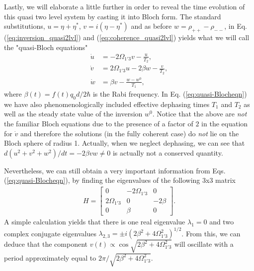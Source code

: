 \documentclass[]{spie}  %
\begin{document}
Lastly, we will elaborate a little further in order to reveal the time evolution of this quasi two level system by casting it into Bloch form. The standard substitutions, $u=\eta + \eta^*$, $v = i(\eta - \eta^*)$ and as before $w = \rho_{++}-\rho_{--}$, in Eq. (\ref{eq:inversion_quasi2lvl}) and (\ref{eq:coherence_quasi2lvl}) yields what we will call the "quasi-Bloch equations"
\begin{subequations}
\label{eq:quasi-Blocheqn}
\begin{align}
\dot{u} &= -2\Omega_{1'3} v - \frac{u}{T_2}, \\
\dot{v} &= 2\Omega_{1'3} u -2\beta w - \frac{v}{T_2}, \\
\dot{w} &= \beta v - \frac{w-w^0}{T_1},
\end{align}
\end{subequations}
where $\beta(t) = f(t)q_0d/2\hbar$ is the Rabi frequency. In Eq. (\ref{eq:quasi-Blocheqn}) we have also phenomenologically included effective dephasing times $T_1$ and $T_2$ as well as the steady state value of the inversion $w^0$. Notice that the above are \emph{not} the familiar Bloch equations due to the presence of a factor of $2$ in the equation for $\dot{v}$ and therefore the solutions (in the fully coherent case) do \emph{not} lie on the Bloch sphere of radius 1. Actually, when we neglect dephasing, we can see that $d(u^2+v^2+w^2)/dt = -2\beta vw \neq 0$ is actually not a conserved quantity. 

Nevertheless, we can still obtain a very important information from Eqs. (\ref{eq:quasi-Blocheqn}), by finding the eigenvalues of the following 3x3 matrix
\begin{eqnarray}
\label{eq:H_mtx}
H = \begin{bmatrix}
	0 & -2\Omega_{1'3} & 0 \\
	2\Omega_{1'3} & 0 & -2\beta \\
	0 & \beta & 0
\end{bmatrix}.
\end{eqnarray} 
A simple calculation yields that there is one real eigenvalue $\lambda_1 = 0$ and two complex conjugate eigenvalues $\lambda_{2,3} = \pm i (2\beta^2+4\Omega_{1'3}^2)^{1/2}$. From this, we can deduce that the component $v(t) \propto \cos{\sqrt{2\beta^2+4\Omega_{1'3}^2}}$ will oscillate with a period approximately equal to $2\pi/\sqrt{2\beta^2+4\Omega_{1'3}^2}$.
\end{document}
